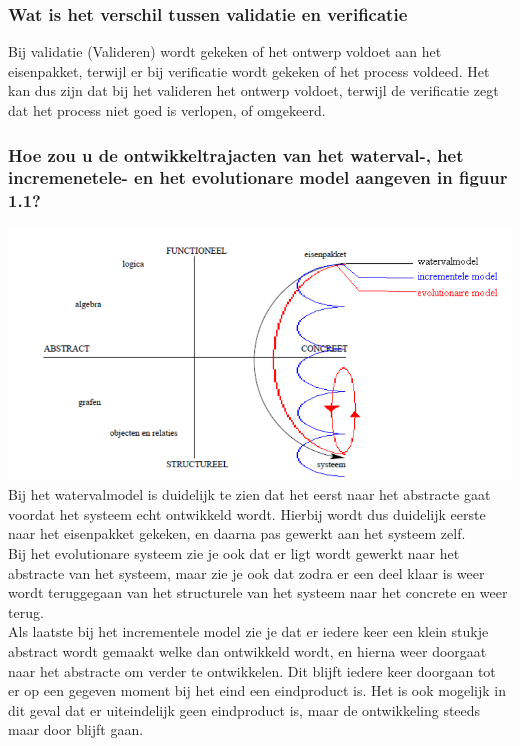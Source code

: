 \documentclass[a4paper,titlepage]{artikel1}
\begin{document}
   \subsubsection[Opdracht 3]{Wat is het verschil tussen validatie en verificatie}
   Bij validatie (Valideren) wordt gekeken of het ontwerp voldoet aan het eisenpakket, terwijl er bij verificatie wordt gekeken of het process voldeed. Het kan dus zijn dat bij het valideren het ontwerp voldoet, terwijl de verificatie zegt dat het process niet goed is verlopen, of omgekeerd. 
   
   \subsubsection[Opdracht 4]{Hoe zou u de ontwikkeltrajacten van het waterval-, het incremenetele- en het evolutionare model aangeven in figuur 1.1?}
   \includegraphics[scale=0.5]{H1O4.png}
   Bij het watervalmodel is duidelijk te zien dat het eerst naar het abstracte gaat voordat het systeem echt ontwikkeld wordt. Hierbij wordt dus duidelijk eerste naar het eisenpakket gekeken, en daarna pas gewerkt aan het systeem zelf. \\
   Bij het evolutionare systeem zie je ook dat er ligt wordt gewerkt naar het abstracte van het systeem, maar zie je ook dat zodra er een deel klaar is weer wordt teruggegaan van het structurele van het systeem naar het concrete en weer terug.\\
   Als laatste bij het incrementele model zie je dat er iedere keer een klein stukje abstract wordt gemaakt welke dan ontwikkeld wordt, en hierna weer doorgaat naar het abstracte om verder te ontwikkelen. Dit blijft iedere keer doorgaan tot er op een gegeven moment bij het eind een eindproduct is. Het is ook mogelijk in dit geval dat er uiteindelijk geen eindproduct is, maar de ontwikkeling steeds maar door blijft gaan.
   
\end{document}
